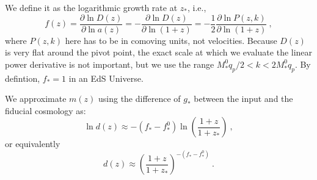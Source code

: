 We define it as the logarithmic growth rate at $z_\ast$, i.e.,
\begin{equation}
 f(z) = \frac{\partial \ln D(z)}{\partial \ln a(z)}
  = - \frac{\partial \ln D(z)}{\partial \ln (1+z)}
  = - \frac{1}{2} \frac{\partial \ln P(z,k)}{\partial \ln (1+z)} ~,
\end{equation}
where $P(z,k)$ here has to be in comoving units, not velocities.
Because $D(z)$ is very flat around the pivot point, the exact scale at which
we evaluate the linear power derivative is not important, but we use the
range $ M_\ast^0 q_p /2 < k < 2 M_\ast^0 q_p$.
By defintion, $f_\ast=1$ in an EdS Universe.

We approximate $m(z)$ using the difference of $g_\ast$ between the input
and the fiducial cosmology as:
\begin{equation}
 \ln d(z) \approx - \left( f_\ast - f^0_\ast \right) 
    \ln \left( \frac{1+z}{1+z_\ast} \right) ~,
\end{equation}
or equivalently
\begin{equation}
 d(z) \approx \left( \frac{1+z}{1+z_\ast} \right)^{- ( f_\ast - f^0_\ast)} ~.
\end{equation}

